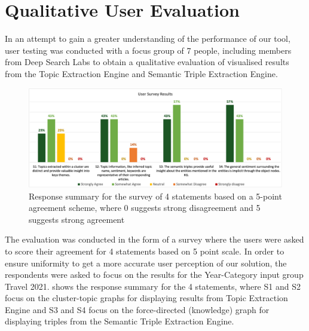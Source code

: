 \section{Qualitative User Evaluation} \label{s:user_eval}
In an attempt to gain a greater understanding of the performance of our tool, user testing was conducted with a focus group of 7 people, including members from Deep Search Labs to obtain a qualitative evaluation of visualised results from the Topic Extraction Engine and Semantic Triple Extraction Engine.

\begin{figure}[H]
\centering     %
\includegraphics[width=0.95\linewidth]{images/eval/user_eval.png}
\caption{Response summary for the survey of 4 statements based on a 5-point agreement scheme, where 0 suggests strong disagreement and 5 suggests strong agreement}
\label{user_eval}
\end{figure}

The evaluation was conducted in the form of a survey where the users were asked to score their agreement for 4 statements based on 5 point scale. In order to ensure uniformity to get a more accurate user perception of our solution, the respondents were asked to focus on the results for the Year-Category input group Travel 2021.  shows the response summary for the 4 statements, where S1 and S2 focus on the cluster-topic graphs for displaying results from Topic Extraction Engine and S3 and S4 focus on the force-directed (knowledge) graph for displaying triples from the Semantic Triple Extraction Engine. 

